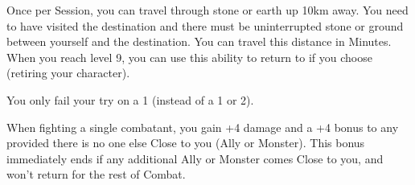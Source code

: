 \begin{multicols*}{2}

Once per Session, you can travel through stone or earth up 10km away. You need to have visited the destination and there must be uninterrupted stone or ground between yourself and the destination. You can travel this distance in Minutes. When you reach level 9, you can use this ability to return to  if you choose (retiring your character).


You only fail your \DEATH try on a 1 (instead of a 1 or 2).


When fighting a single combatant, you gain +4 damage and a +4 bonus to any  provided there is no one else Close to you (Ally or Monster). This bonus immediately ends if any additional Ally or Monster comes Close to you, and won't return for the rest of Combat.

\end{multicols*}
